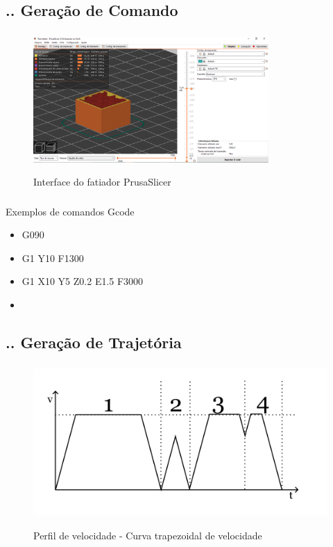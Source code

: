 \documentclass[aspectratio=169]{beamer}
\begin{document}
\subsection{\insertsectionnumber .\insertsubsectionnumber . Geração de Comando}
\begin{frame}
  \frametitle{\insertsubsection}
  \begin{figure}[H]
    \centering
    \caption{Interface do fatiador PrusaSlicer}
    \includegraphics[width=0.8\textwidth]{slicer_inter}
    \label{fig:slicer_inter}
  \end{figure}
\end{frame}

\begin{frame}
  \frametitle{\insertsubsection}
  Exemplos de comandos Gcode
  \begin{itemize}
    \item G090
    \item G1 Y10 F1300
    \item G1 X10 Y5 Z0.2 E1.5 F3000
    \item 
  \end{itemize}
\end{frame}

\subsection{\insertsectionnumber .\insertsubsectionnumber . Geração de Trajetória}
\begin{frame}
  \frametitle{\insertsubsection}
  \begin{figure}[H]
    \centering
    \caption{Perfil de velocidade - Curva trapezoidal de velocidade}
    \includegraphics[scale=0.5]{trap_triang}
    \label{fig:trap_triang}
  \end{figure}
\end{frame}
\end{document}
